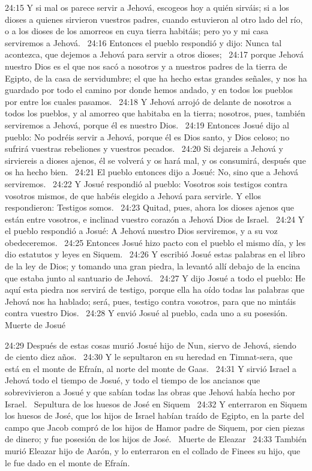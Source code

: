 24:15 Y si mal os parece servir a Jehová, escogeos hoy a quién sirváis; si a los dioses a quienes sirvieron vuestros padres, cuando estuvieron al otro lado del río, o a los dioses de los amorreos en cuya tierra habitáis; pero yo y mi casa serviremos a Jehová.  
24:16 Entonces el pueblo respondió y dijo: Nunca tal acontezca, que dejemos a Jehová para servir a otros dioses;  
24:17 porque Jehová nuestro Dios es el que nos sacó a nosotros y a nuestros padres de la tierra de Egipto, de la casa de servidumbre; el que ha hecho estas grandes señales, y nos ha guardado por todo el camino por donde hemos andado, y en todos los pueblos por entre los cuales pasamos.  
24:18 Y Jehová arrojó de delante de nosotros a todos los pueblos, y al amorreo que habitaba en la tierra; nosotros, pues, también serviremos a Jehová, porque él es nuestro Dios.  
24:19 Entonces Josué dijo al pueblo: No podréis servir a Jehová, porque él es Dios santo, y Dios celoso; no sufrirá vuestras rebeliones y vuestros pecados.  
24:20 Si dejareis a Jehová y sirviereis a dioses ajenos, él se volverá y os hará mal, y os consumirá, después que os ha hecho bien.  
24:21 El pueblo entonces dijo a Josué: No, sino que a Jehová serviremos.  
24:22 Y Josué respondió al pueblo: Vosotros sois testigos contra vosotros mismos, de que habéis elegido a Jehová para servirle. Y ellos respondieron: Testigos somos.  
24:23 Quitad, pues, ahora los dioses ajenos que están entre vosotros, e inclinad vuestro corazón a Jehová Dios de Israel.  
24:24 Y el pueblo respondió a Josué: A Jehová nuestro Dios serviremos, y a su voz obedeceremos.  
24:25 Entonces Josué hizo pacto con el pueblo el mismo día, y les dio estatutos y leyes en Siquem.  
24:26 Y escribió Josué estas palabras en el libro de la ley de Dios; y tomando una gran piedra, la levantó allí debajo de la encina que estaba junto al santuario de Jehová.  
24:27 Y dijo Josué a todo el pueblo: He aquí esta piedra nos servirá de testigo, porque ella ha oído todas las palabras que Jehová nos ha hablado; será, pues, testigo contra vosotros, para que no mintáis contra vuestro Dios.  
24:28 Y envió Josué al pueblo, cada uno a su posesión.  
Muerte de Josué  

24:29 Después de estas cosas murió Josué hijo de Nun, siervo de Jehová, siendo de ciento diez años.  
24:30 Y le sepultaron en su heredad en Timnat-sera, que está en el monte de Efraín, al norte del monte de Gaas.  
24:31 Y sirvió Israel a Jehová todo el tiempo de Josué, y todo el tiempo de los ancianos que sobrevivieron a Josué y que sabían todas las obras que Jehová había hecho por Israel.  
Sepultura de los huesos de José en Siquem  
24:32 Y enterraron en Siquem los huesos de José, que los hijos de Israel habían traído de Egipto, en la parte del campo que Jacob compró de los hijos de Hamor padre de Siquem, por cien piezas de dinero; y fue posesión de los hijos de José.  
Muerte de Eleazar  
24:33 También murió Eleazar hijo de Aarón, y lo enterraron en el collado de Finees su hijo, que le fue dado en el monte de Efraín.